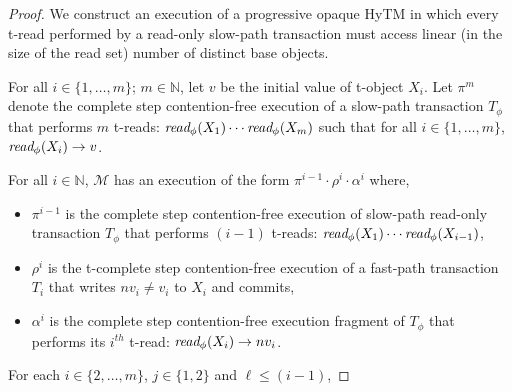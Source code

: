 \begin{proof}
We construct an execution of a progressive opaque HyTM in which every t-read performed by a read-only slow-path transaction
must access linear (in the size of the read set) number of distinct base objects.

For all $i\in \{1,\ldots , m\}$; $m \in \mathbb{N}$, let 
$v$ be the initial value of t-object $X_i$.
Let $\pi^{m}$ denote the complete step contention-free execution of a slow-path transaction
$T_{\phi}$ that performs ${m}$ t-reads: $\textit{read}_{\phi}(X_1)\cdots \textit{read}_{\phi}(X_{m})$
such that for all $i\in \{1,\ldots , m \}$, $\textit{read}_{\phi}(X_i) \rightarrow v$.
%
\begin{claim}
\label{cl:readdap}
For all $i\in \mathbb{N}$, $\mathcal{M}$ has an execution of the form $\pi^{i-1}\cdot \rho^i\cdot \alpha^i$ where,
%
\begin{itemize}
\item
$\pi^{i-1}$ is the complete step contention-free execution of slow-path read-only transaction $T_{\phi}$ that performs
$(i-1)$ t-reads: $\textit{read}_{\phi}(X_1)\cdots \textit{read}_{\phi}(X_{i-1})$,
\item
$\rho^i$ is the t-complete step contention-free execution of a fast-path transaction $T_{i}$
that writes $nv_i\neq v_i$ to $X_i$ and commits,
\item
$\alpha^i$ is the complete step contention-free execution fragment of $T_{\phi}$ that performs its $i^{th}$ t-read:
$\textit{read}_{\phi}(X_i) \rightarrow nv_i$.
\end{itemize}
%
\end{claim}
%
% 
%
For each $i\in \{2,\ldots, m\}$, $j\in \{1,2\}$ and $\ell \leq (i-1)$, 

\end{proof}

